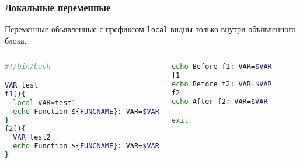 \begin{frame}[fragile]
	\frametitle{Локальные переменные}

	Переменные объявленные с префиксом {\tt local} видны только внутри объявленного блока.

	\small
	\begin{columns}
        \begin{lstlisting}[language=bash,frame=single]
#!/bin/bash

VAR=test
f1(){
  local VAR=test1
  echo Function ${FUNCNAME}: VAR=$VAR
}
f2(){
  VAR=test2
  echo Function ${FUNCNAME}: VAR=$VAR
}
\end{lstlisting}
\begin{lstlisting}[language=bash,frame=single]
echo Before f1: VAR=$VAR
f1
echo Before f2: VAR=$VAR
f2
echo After f2: VAR=$VAR

exit
\end{lstlisting}
	\end{columns}

\end{frame}
